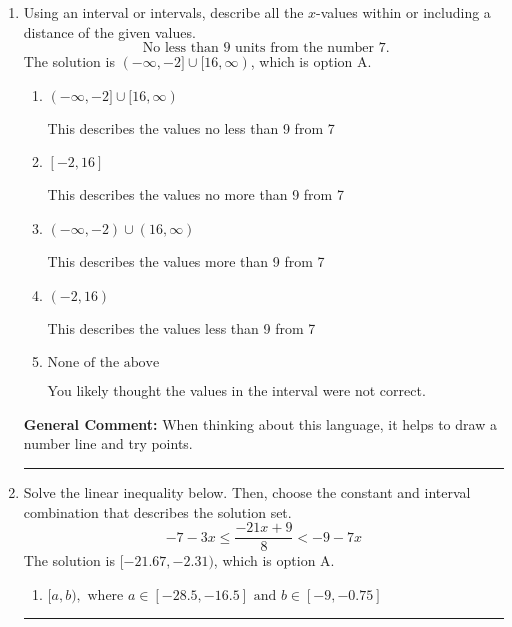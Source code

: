 \documentclass{extbook}[14pt]
\newcommand{\litem}[1]{\item #1

\rule{\textwidth}{0.4pt}}
\begin{document}
\begin{enumerate}
{\begin{enumerate}[label=\Alph*.]
$(11.00, -2.70]$, which corresponds to flipping the inequality and getting negatives of the actual endpoints.
\item \( (-\infty, a) \cup [b, \infty), \text{ where } a \in [8.25, 13.5] \text{ and } b \in [-3.75, -1.5] \)

$(-\infty, 11.00) \cup [-2.70, \infty)$, which corresponds to displaying the and-inequality as an or-inequality AND flipping the inequality AND getting negatives of the actual endpoints.
\item \( (-\infty, a] \cup (b, \infty), \text{ where } a \in [8.25, 13.5] \text{ and } b \in [-5.25, -2.25] \)

$(-\infty, 11.00] \cup (-2.70, \infty)$, which corresponds to displaying the and-inequality as an or-inequality and getting negatives of the actual endpoints.
\item \( \text{None of the above.} \)

* This is correct as the answer should be $[-11.00, 2.70)$.
\end{enumerate}

\textbf{General Comment:} To solve, you will need to break up the compound inequality into two inequalities. Be sure to keep track of the inequality! It may be best to draw a number line and graph your solution.
}
\litem{
Using an interval or intervals, describe all the $x$-values within or including a distance of the given values.
\[ \text{ No less than } 9 \text{ units from the number } 7. \]The solution is \( (-\infty, -2] \cup [16, \infty) \), which is option A.\begin{enumerate}[label=\Alph*.]
\item \( (-\infty, -2] \cup [16, \infty) \)

This describes the values no less than 9 from 7
\item \( [-2, 16] \)

This describes the values no more than 9 from 7
\item \( (-\infty, -2) \cup (16, \infty) \)

This describes the values more than 9 from 7
\item \( (-2, 16) \)

This describes the values less than 9 from 7
\item \( \text{None of the above} \)

You likely thought the values in the interval were not correct.
\end{enumerate}

\textbf{General Comment:} When thinking about this language, it helps to draw a number line and try points.
}
\litem{
Solve the linear inequality below. Then, choose the constant and interval combination that describes the solution set.
\[ -7 - 3 x \leq \frac{-21 x + 9}{8} < -9 - 7 x \]The solution is \( [-21.67, -2.31) \), which is option A.\begin{enumerate}[label=\Alph*.]
\item \( [a, b), \text{ where } a \in [-28.5, -16.5] \text{ and } b \in [-9, -0.75] \)


\end{enumerate}}
\end{enumerate}
\end{document}
